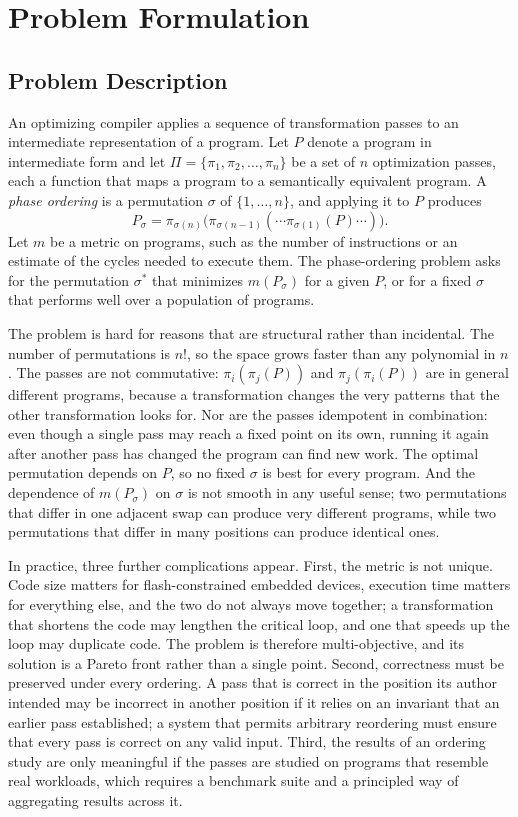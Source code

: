 \chapter{Problem Formulation}

\section{Problem Description}

An optimizing compiler applies a sequence of transformation passes to an intermediate representation of a program. Let $P$ denote a program in intermediate form and let $\Pi = \{\pi_1, \pi_2, \ldots, \pi_n\}$ be a set of $n$ optimization passes, each a function that maps a program to a semantically equivalent program. A \emph{phase ordering} is a permutation $\sigma$ of $\{1, \ldots, n\}$, and applying it to $P$ produces
\[
  P_\sigma = \pi_{\sigma(n)}\bigl(\pi_{\sigma(n-1)}(\cdots \pi_{\sigma(1)}(P)\cdots)\bigr).
\]
Let $m$ be a metric on programs, such as the number of instructions or an estimate of the cycles needed to execute them. The phase-ordering problem asks for the permutation $\sigma^\ast$ that minimizes $m(P_\sigma)$ for a given $P$, or for a fixed $\sigma$ that performs well over a population of programs.

The problem is hard for reasons that are structural rather than incidental. The number of permutations is $n!$, so the space grows faster than any polynomial in $n$. The passes are not commutative: $\pi_i(\pi_j(P))$ and $\pi_j(\pi_i(P))$ are in general different programs, because a transformation changes the very patterns that the other transformation looks for. Nor are the passes idempotent in combination: even though a single pass may reach a fixed point on its own, running it again after another pass has changed the program can find new work. The optimal permutation depends on $P$, so no fixed $\sigma$ is best for every program. And the dependence of $m(P_\sigma)$ on $\sigma$ is not smooth in any useful sense; two permutations that differ in one adjacent swap can produce very different programs, while two permutations that differ in many positions can produce identical ones.

In practice, three further complications appear. First, the metric is not unique. Code size matters for flash-constrained embedded devices, execution time matters for everything else, and the two do not always move together; a transformation that shortens the code may lengthen the critical loop, and one that speeds up the loop may duplicate code. The problem is therefore multi-objective, and its solution is a Pareto front rather than a single point. Second, correctness must be preserved under every ordering. A pass that is correct in the position its author intended may be incorrect in another position if it relies on an invariant that an earlier pass established; a system that permits arbitrary reordering must ensure that every pass is correct on any valid input. Third, the results of an ordering study are only meaningful if the passes are studied on programs that resemble real workloads, which requires a benchmark suite and a principled way of aggregating results across it.

